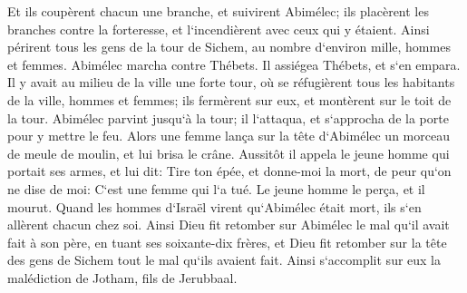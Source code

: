 \verse Et ils coupèrent chacun une branche, et suivirent Abimélec; ils placèrent les branches contre la forteresse, et l`incendièrent avec ceux qui y étaient. Ainsi périrent tous les gens de la tour de Sichem, au nombre d`environ mille, hommes et femmes. 
\verse Abimélec marcha contre Thébets. Il assiégea Thébets, et s`en empara. 
\verse Il y avait au milieu de la ville une forte tour, où se réfugièrent tous les habitants de la ville, hommes et femmes; ils fermèrent sur eux, et montèrent sur le toit de la tour. 
\verse Abimélec parvint jusqu`à la tour; il l`attaqua, et s`approcha de la porte pour y mettre le feu. 
\verse Alors une femme lança sur la tête d`Abimélec un morceau de meule de moulin, et lui brisa le crâne. 
\verse Aussitôt il appela le jeune homme qui portait ses armes, et lui dit: Tire ton épée, et donne-moi la mort, de peur qu`on ne dise de moi: C`est une femme qui l`a tué. Le jeune homme le perça, et il mourut. 
\verse Quand les hommes d`Israël virent qu`Abimélec était mort, ils s`en allèrent chacun chez soi. 
\verse Ainsi Dieu fit retomber sur Abimélec le mal qu`il avait fait à son père, en tuant ses soixante-dix frères, 
\verse et Dieu fit retomber sur la tête des gens de Sichem tout le mal qu`ils avaient fait. Ainsi s`accomplit sur eux la malédiction de Jotham, fils de Jerubbaal. 

\chapter{}


